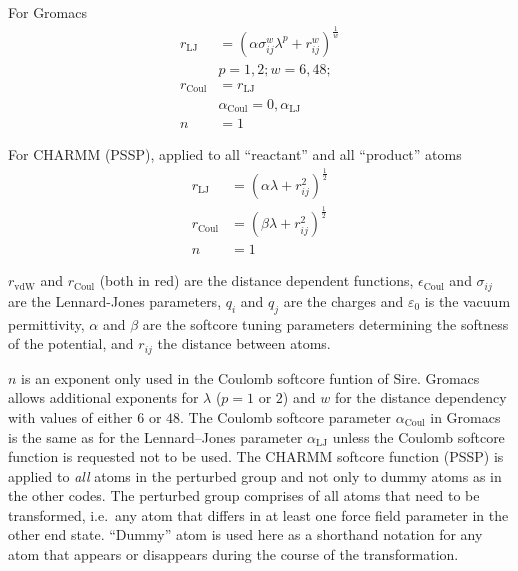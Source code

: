 \documentclass[journal=jctcce,manuscript=suppinfo]{achemso}
\begin{document}
For Gromacs
\begin{equation}
  \begin{split}
    r_{\mathrm{LJ}} &= (\alpha \sigma_{ij}^{w} \lambda^{p} +
    r_{ij}^{w})^{\frac{1}{w}} \\
    &p = 1,2; w = 6,48; \\
    r_{\mathrm{Coul}} &= r_{\mathrm{LJ}} \\
    &\alpha_{\mathrm{Coul}} = 0,\alpha_{\mathrm{LJ}} \\
    n &= 1
  \end{split}
  \label{eq:Gromacs}
\end{equation}

For CHARMM (PSSP), applied to all ``reactant'' and all ``product'' atoms
\begin{equation}
  \begin{split}
    r_{\mathrm{LJ}} &= (\alpha \lambda + r_{ij}^2)^{\frac{1}{2}} \\
    r_{\mathrm{Coul}} &= (\beta\lambda + r_{ij}^{2})^{\frac{1}{2}} \\
    n &= 1
   \end{split}
  \label{eq:CHARMM}
\end{equation}

$r_{\mathrm{vdW}}$ and $r_{\mathrm{Coul}}$ (both in red) are the
distance dependent functions, $\epsilon_{\mathrm{Coul}}$ and
$\sigma_{ij}$ are the Lennard-Jones parameters, $q_{i}$ and $q_{j}$
are the charges and $\varepsilon_{0}$ is the vacuum permittivity,
$\alpha$ and $\beta$ are the softcore tuning parameters determining
the softness of the potential, and $r_{ij}$ the distance between
atoms.

$n$ is an exponent only used in the Coulomb softcore funtion of Sire.
Gromacs allows additional exponents for $\lambda$ ($p = 1$ or $2$) and
$w$ for the distance dependency with values of either $6$ or $48$.
The Coulomb softcore parameter $\alpha_{\mathrm{Coul}}$ in Gromacs is
the same as for the Lennard--Jones parameter $\alpha_{\mathrm{LJ}}$
unless the Coulomb softcore function is requested not to be used.  The
CHARMM softcore function (PSSP) is applied to \emph{all} atoms in the
perturbed group and not only to dummy atoms as in the other codes.
The perturbed group comprises of all atoms that need to be
transformed, i.e.\ any atom that differs in at least one force field
parameter in the other end state.  ``Dummy'' atom is used here as a
shorthand notation for any atom that appears or disappears during the
course of the transformation.
\end{document}
